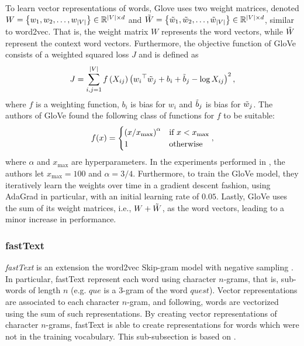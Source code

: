To learn vector representations of words, Glove uses two weight matrices, denoted $W=\left\{w_1, w_2, \ldots, w_{|V|}\right\} \in \mathbb{R}^{|V| \times d}$ and $\Tilde{W}=\left\{\Tilde{w}_1, \Tilde{w}_2, \ldots, \Tilde{w}_{|V|}\right\} \in \mathbb{R}^{|V| \times d}$, similar to word2vec. That is, the weight matrix $W$ represents the word vectors, while $\Tilde{W}$ represent the context word vectors. Furthermore, the objective function of GloVe consists of a weighted squared loss $J$ and is defined as
\begin{align}
    J = \sum\limits_{i, j = 1}^{|V|} f \left(X_{ij}\right) \left({w_i}^\top \Tilde{w}_j + b_i + \Tilde{b}_j - \log X_{ij}\right)^2,
    \label{eqn:glove-loss}
\end{align}
where $f$ is a weighting function, $b_i$ is bias for $w_i$ and $\Tilde{b}_j$ is bias for $\Tilde{w}_j$. The authors of GloVe found the following class of functions for $f$ to be suitable:
\begin{align}
    f(x) = \begin{cases}
        \left(x / x_{\text{max}}\right)^\alpha & \mbox{if } x < x_{\text{max}} \\
        1 & \text{otherwise}
    \end{cases},
    \label{eqn:glove-loss-f-function}
\end{align}
where $\alpha$ and $x_{\text{max}}$ are hyperparameters. In the experiments performed in \cite{pennington2014glove}, the authors let $x_{\text{max}}=100$ and $\alpha=3/4$. Furthermore, to train the GloVe model, they iteratively learn the weights over time in a gradient descent fashion, using AdaGrad \cite{Duchi2011} in particular, with an initial learning rate of $0.05$. Lastly, GloVe uses the sum of its weight matrices, i.e., $W + \Tilde{W}$, as the word vectors, leading to a minor increase in performance.

\subsubsection{fastText}
\label{sec:fasttext}
\textit{fastText} is an extension the word2vec Skip-gram model with negative sampling \cite{bojanowski2017enriching}. In particular, fastText represent each word using character $n$-grams, that is, sub-words of length $n$ (e.g. $\textit{que}$ is a $3$-gram of the word $\textit{quest}$). Vector representations are associated to each character $n$-gram, and following, words are vectorized using the sum of such representations. By creating vector representations of character $n$-grams, fastText is able to create representations for words which were not in the training vocabulary. This sub-subsection is based on \cite{bojanowski2017enriching}.

